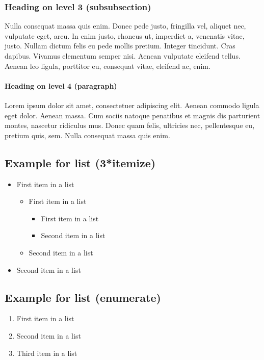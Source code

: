 \documentclass[11pt,english]{article}
\numberwithin{equation}{section}%
\numberwithin{figure}{section}%
\numberwithin{table}{section}%
\begin{document}
\subsubsection{Heading on level 3 (subsubsection)}
Nulla consequat massa quis enim. Donec pede justo, fringilla vel, aliquet nec, vulputate eget, arcu. In enim justo, rhoncus ut, imperdiet a, venenatis vitae, justo. Nullam dictum felis eu pede mollis pretium. Integer tincidunt. Cras dapibus. Vivamus elementum semper nisi. Aenean vulputate eleifend tellus. Aenean leo ligula, porttitor eu, consequat vitae, eleifend ac, enim.

\paragraph{Heading on level 4 (paragraph)}
Lorem ipsum dolor sit amet, consectetuer adipiscing elit. Aenean commodo ligula eget dolor. Aenean massa. Cum sociis natoque penatibus et magnis dis parturient montes, nascetur ridiculus mus. Donec quam felis, ultricies nec, pellentesque eu, pretium quis, sem. Nulla consequat massa quis enim.

\subsection{Example for list (3*itemize)}
\begin{itemize}
	\item First item in a list 
		\begin{itemize}
		\item First item in a list 
			\begin{itemize}
			\item First item in a list 
			\item Second item in a list 
			\end{itemize}
		\item Second item in a list 
		\end{itemize}
	\item Second item in a list 
\end{itemize}

\subsection{Example for list (enumerate)}
\begin{enumerate}
	\item First item in a list 
	\item Second item in a list 
	\item Third item in a list
\end{enumerate}

\newpage
\listoffigures

\newpage
\listoftables


\newpage



\end{document}
